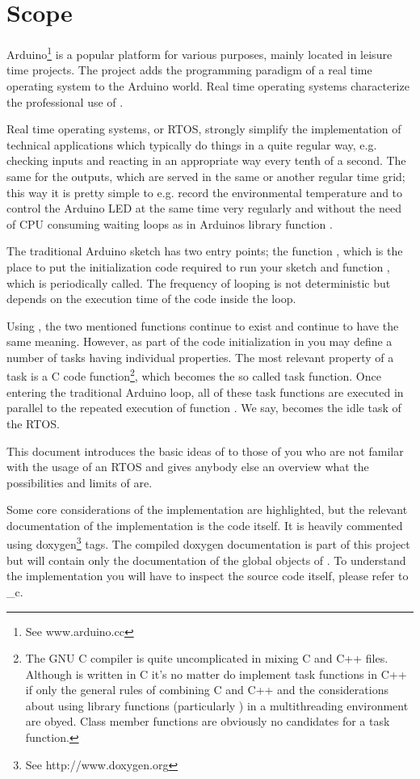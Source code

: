 \chapter{Scope}
\label{secScope}

Arduino\footnote{See www.arduino.cc} is a popular \uC{} platform for
various purposes, mainly located in leisure time projects. The \rtos{}
project adds the programming paradigm of a real time operating system to
the Arduino world. Real time operating systems characterize the
professional use of \uCs{}.

Real time operating systems, or RTOS, strongly simplify the implementation
of technical applications which typically do things in a quite regular
way, e.g. checking inputs and reacting in an appropriate way every tenth
of a second. The same for the outputs, which are served in the same or
another regular time grid; this way it is pretty simple to e.g. record the
environmental temperature and to control the Arduino LED at the same time
very regularly and without the need of CPU consuming waiting loops as
in Arduinos library function .

The traditional Arduino sketch has two entry points; the function
, which is the place to put the initialization code required
to run your sketch and function , which is periodically
called. The frequency of looping is not deterministic but depends on
the execution time of the code inside the loop.

Using \rtos{}, the two mentioned functions continue to exist and continue to
have the same meaning. However, as part of the code initialization in
 you may define a number of tasks having individual
properties. The most relevant property of a task is a C code
function\footnote{The GNU C compiler is quite uncomplicated in mixing C
and C++ files. Although \rtos{} is written in C it's no matter do implement
task functions in C++ if only the general rules of combining C and C++ and
the considerations about using library functions (particularly
) in a multithreading environment are obyed. Class member
functions are obviously no candidates for a task function.}, which becomes
the so called task function. Once entering the traditional Arduino loop,
all of these task functions are executed in parallel to the repeated
execution of function . We say,  becomes the idle
task of the RTOS.

This document introduces the basic ideas of \rtos{} to those of you who are
not familar with the usage of an RTOS and gives anybody else an overview
what the possibilities and limits of \rtos{} are.

Some core considerations of the implementation are highlighted, but the
relevant documentation of the implementation is the code itself. It is
heavily commented using doxygen\footnote{See http://www.doxygen.org} tags.
The compiled doxygen documentation is part of this project but will
contain only the documentation of the global objects of \rtos. To
understand the implementation you will have to inspect the source code
itself, please refer to _c.


